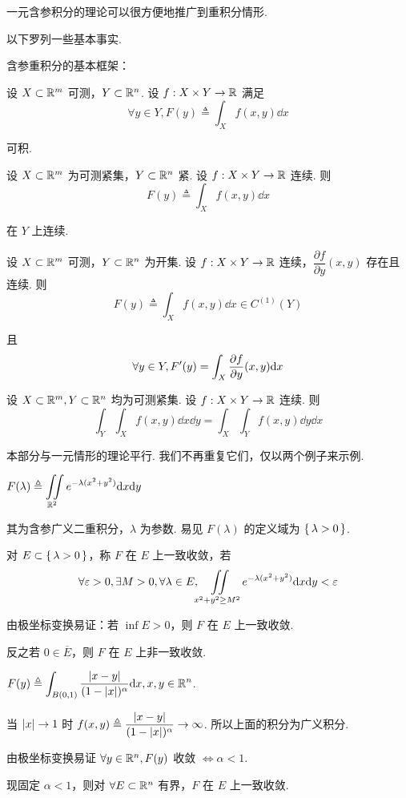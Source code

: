 一元含参积分的理论可以很方便地推广到重积分情形.

以下罗列一些基本事实.


含参重积分的基本框架：

设 $X\subset\mathbb{R}^m$ 可测，$Y\subset\mathbb{R}^n$. 设 $f:X\times Y\to\mathbb{R}$ 满足
$$
\forall y\in Y,F(y)\triangleq\int_Xf(x,y)\dd x
$$

可积.

\begin{property}
    设 $X\subset\mathbb{R}^m$ 为可测紧集，$Y\subset\mathbb{R}^n$ 紧. 设 $f:X\times Y\to\mathbb{R}$ 连续. 则
$$
F(y)\triangleq\int_Xf(x,y)\dd x
$$

    在 $Y$ 上连续.
\end{property}

\begin{property}
    设 $X\subset\mathbb{R}^m$ 可测，$Y\subset\mathbb{R}^n$ 为开集. 设 $f:X\times Y\to\mathbb{R}$ 连续，$\dfrac{\partial f}{\partial y}(x,y)$ 存在且连续. 则
$$
F(y)\triangleq\int_Xf(x,y)\dd x\in C^{(1)}(Y)
$$

    且
$$
\forall y\in Y,F'(y)=\int_X\frac{\partial{f}}{\partial{y}}(x,y)\mathrm{d} x
$$
\end{property}

\begin{property}
    设 $X\subset\mathbb{R}^m,Y\subset\mathbb{R}^n$ 均为可测紧集. 设 $f:X\times Y\to\mathbb{R}$ 连续. 则
$$
\int_Y\int_X f(x,y)\dd x\dd y=\int_X\int_Yf(x,y)\dd y\dd x
$$
\end{property}


本部分与一元情形的理论平行. 我们不再重复它们，仅以两个例子来示例.

\begin{example}
    $F(\lambda)\triangleq\displaystyle\iint\limits_{\mathbb{R}^2}e^{-\lambda(x^2+y^2)}\mathrm{d} x\mathrm{d} y$

    其为含参广义二重积分，$\lambda$ 为参数. 易见 $F(\lambda)$ 的定义域为 $\set{\lambda>0}$.

    对 $E\subset\set{\lambda>0}$，称 $F$ 在 $E$ 上一致收敛，若
$$
\forall\varepsilon>0,\exists M>0,\forall\lambda\in E,\iint\limits_{x^2+y^2\ge M^2}e^{-\lambda(x^2+y^2)}\mathrm{d} x\mathrm{d} y<\varepsilon
$$

    由极坐标变换易证：若 $\inf E>0$，则 $F$ 在 $E$ 上一致收敛.
    
    反之若 $0\in\overline{E}$，则 $F$ 在 $E$ 上非一致收敛.
\end{example}

\begin{example}
    $F(y)\triangleq\displaystyle\int_{B(0,1)}\frac{\left\lvert{x-y}\right\rvert}{(1-\left\lvert{x}\right\rvert)^\alpha}\mathrm{d} x,x,y\in\mathbb{R}^n$.

    当 $\left\lvert{x}\right\rvert\to 1$ 时 $f(x,y)\triangleq\dfrac{\left\lvert{x-y}\right\rvert}{(1-\left\lvert{x}\right\rvert)^\alpha}\to\infty$. 所以上面的积分为广义积分.

    由极坐标变换易证 $\forall y\in\mathbb{R}^n,F(y)$ 收敛 $\iff\alpha<1$.

    现固定 $\alpha<1$，则对 $\forall E\subset\mathbb{R}^n$ 有界，$F$ 在 $E$ 上一致收敛.
\end{example}

